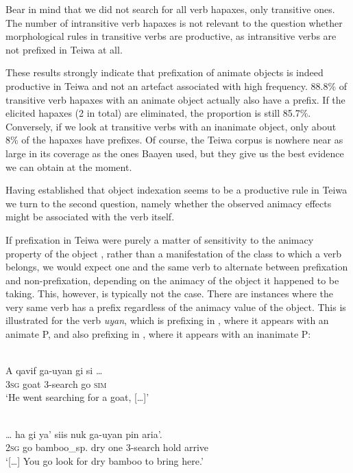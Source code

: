 Bear in mind that we did not search for all verb hapaxes, only transitive ones. The number of intransitive verb hapaxes is not relevant to the question whether morphological rules in transitive verbs are productive, as intransitive verbs are not prefixed in Teiwa  at all.

These results strongly indicate that prefixation of animate objects is indeed productive in Teiwa  and not an artefact associated with high frequency. 88.8\% of transitive verb hapaxes with an animate object actually also have a prefix. If the elicited hapaxes (2 in total) are eliminated, the proportion is still 85.7\%. Conversely, if we look at transitive verbs with an inanimate object, only about 8\% of the hapaxes have prefixes. Of course, the Teiwa  corpus is nowhere near as large in its coverage as the ones Baayen used, but they give us the best evidence we can obtain at the moment.

Having established that object indexation seems to be a productive rule in Teiwa  we turn to the second question, namely whether the observed animacy effects might be associated with the verb itself. 

If prefixation in Teiwa  were purely a matter of sensitivity to the animacy  property of the object , rather than a manifestation of the class  to which a verb belongs, we would expect one and the same verb to alternate  between prefixation and non-prefixation, depending on the animacy of the object it happened to be taking. This, however, is typically not the case. There are instances where the very same verb has a prefix regardless of the animacy value of the object. This is illustrated for the verb \textit{uyan}, which is prefixing in , where it appears with an animate P, and also prefixing in , where it appears with an inanimate P:


\ea 
\label{ex:1241}
 \\ 
 \gll    A  qavif    ga-uyan  gi  si  \dots\\
    3\textsc{sg} goat  3-search  go  \textsc{sim} \\
 \glt`He went searching for a goat, [{\dots}]'

\z



\ea 
\label{ex:1242}
 \\ 
 \gll    \dots {} ha  gi  ya'  siis  nuk  ga-uyan  pin  aria'.\\
{}  2\textsc{sg} go    bamboo\_sp.  dry  one  3-search  hold  arrive \\
 \glt `[{\dots}] You go look for dry bamboo to bring here.'   
\z

